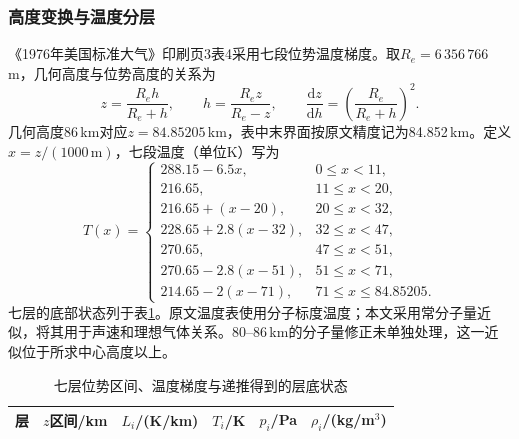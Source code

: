 \documentclass[11pt,a4paper]{article}
\begin{document}
\subsubsection{高度变换与温度分层}
《1976年美国标准大气》印刷页3表4采用七段位势温度梯度\cite{ussa}。取$R_e=6\,356\,766$\,m，几何高度与位势高度的关系为
\begin{equation}
 z=\frac{R_eh}{R_e+h},\qquad h=\frac{R_ez}{R_e-z},\qquad
 \frac{\mathrm dz}{\mathrm dh}=\left(\frac{R_e}{R_e+h}\right)^2.
 \label{eq:height}
\end{equation}
几何高度86\,km对应$z=84.85205$\,km，表中末界面按原文精度记为84.852\,km。定义$x=z/(1000\,\mathrm m)$，七段温度（单位K）写为
\begin{equation}
T(x)=\begin{cases}
288.15-6.5x,&0\le x<11,\\
216.65,&11\le x<20,\\
216.65+(x-20),&20\le x<32,\\
228.65+2.8(x-32),&32\le x<47,\\
270.65,&47\le x<51,\\
270.65-2.8(x-51),&51\le x<71,\\
214.65-2(x-71),&71\le x\le84.85205.
\end{cases}\label{eq:temperature}
\end{equation}
七层的底部状态列于表\ref{tab:layers}。原文温度表使用分子标度温度；本文采用常分子量近似，将其用于声速和理想气体关系。80--86\,km的分子量修正未单独处理，这一近似位于所求中心高度以上。

\begin{table}[htbp]\centering\small
\caption{七层位势区间、温度梯度与递推得到的层底状态}\label{tab:layers}
\begin{tabular}{rrrrrr}\toprule
层 & $z$区间/km & $L_i$/(K/km) & $T_i$/K & $p_i$/Pa & $\rho_i$/(kg/m$^3$)\\\midrule
 
\bottomrule\end{tabular}
\end{table}
\end{document}
